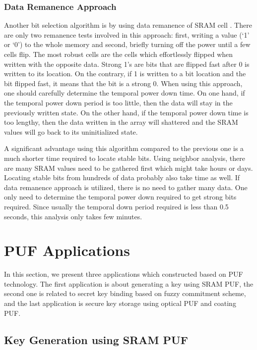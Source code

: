 \subsubsection{Data Remanence Approach}

Another bit selection algorithm is by using data remanence of SRAM cell \cite{liu_zhou_tang_parhi_kim_2017}.
There are only two remanence tests involved in this approach: first, writing a value (‘1’ or ‘0’) to the whole memory and second, briefly turning off the power until a few cells flip. The most robust cells are the cells which effortlessly flipped when written with the opposite data. Strong 1's are bits that are flipped fast after 0 is written to its location. On the contrary, if 1 is written to a bit location and the bit flipped fast, it means that the bit is a strong 0.
When using this approach, one should carefully determine the temporal power down time. On one hand, if the temporal power down period is too little, then the data will stay in the previously written state. On the other hand, if the temporal power down time is too lengthy, then the data written in the array will shattered and the SRAM values will go back to its uninitialized state.

A significant advantage using this algorithm compared to the previous one is a much shorter time required to locate stable bits. Using neighbor analysis, there are many SRAM values need to be gathered first which might take hours or days. Locating stable bits from hundreds of data probably also take time as well. If data remanence approach is utilized, there is no need to gather many data. One only need to determine the temporal power down required to get strong bits required. Since usually the temporal down period required is less than 0.5 seconds, this analysis only takes few minutes.

\section{PUF Applications}
In this section, we present three applications which constructed based on PUF technology. The first application is about generating a key using SRAM PUF, the second one is related to secret key binding based on fuzzy commitment scheme, and the last application is secure key storage using optical PUF and coating PUF.

\subsection{Key Generation using SRAM PUF}

